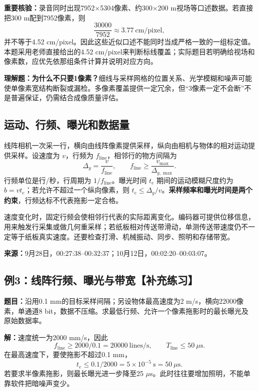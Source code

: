 \textbf{重要核验：}录音同时出现7952$\times$5304像素、约300$\times$200 m视场等口述数据。若直接把300 m配到7952像素，则
\[
\frac{30000}{7952}\approx3.77\ \mathrm{cm/pixel},
\]
并不等于4.52 cm/pixel。因此这些近似口述不能同时当成严格一致的一组标定值。本题采用老师直接给出的4.52 cm/pixel来判断标线覆盖；实际题目若明确给视场和像素数，应优先依那组条件计算并说明对应方向。

\textbf{理解题：为什么不只要1像素？}细线与采样网格的位置关系、光学模糊和噪声可能使单像素宽结构断裂或漏检。多像素覆盖提供一定冗余，但“3像素一定不会断”不是普遍保证，仍需结合成像质量评估。

\subsection{运动、行频、曝光和数据量}
线阵相机一次采一行，横向由线阵像素提供采样，纵向由相机与物体的相对运动提供采样。设速度为 $v$，行频为 $f_{\mathrm{line}}$，相邻行的物方间隔为
\begin{equation}
\Delta_y=\frac{v}{f_{\mathrm{line}}},\qquad
f_{\mathrm{line}}\geq\frac{v_{\max}}{\Delta_{y,\max}}.
\end{equation}
行频单位是行/秒，行周期为 $1/f_{\mathrm{line}}$。曝光时间 $t_e$ 期间的运动模糊尺度约为 $b=vt_e$；若允许不超过一个纵向像素，则 $t_e\leq\Delta_y/v$。\textbf{采样频率和曝光时间是两个约束}，行频达标不代表拖影一定合格。

速度变化时，固定行频会使相邻行代表的实际距离变化。编码器可提供位移信息，用来触发行采集或做几何重采样；若纸板相对传送带滑动，单测传送带速度仍不一定等于纸板真实速度。还要检查打滑、机械振动、同步、照明和存储带宽。

\noindent\textbf{来源：}9月28日，00:27:38--00:32:37；10月12日，00:02:20--00:03:07。

\subsection{例3：线阵行频、曝光与带宽【补充练习】}
\textbf{题目：}沿用0.1 mm的目标采样间隔；另设物体最高速度为2 m/s，横向22000像素，单通道8 bit，数据不压缩。求最低行频、允许一个像素拖影时的最长曝光及原始数据率。

\textbf{解：}速度统一为2000 mm/s，因此
\[
f_{\mathrm{line}}\geq2000/0.1=20000\ \mathrm{lines/s},\qquad
T_{\mathrm{line}}\leq50\ \mu\mathrm{s}.
\]
在最高速度下，要使拖影不超过0.1 mm，
\[
t_e\leq0.1/2000=5\times10^{-5}\ \mathrm{s}=50\ \mu\mathrm{s}.
\]
若要求半像素拖影，则最长曝光进一步降至25 $\mu$s。此时往往要增加照明，不能单靠软件把暗噪声变少。

